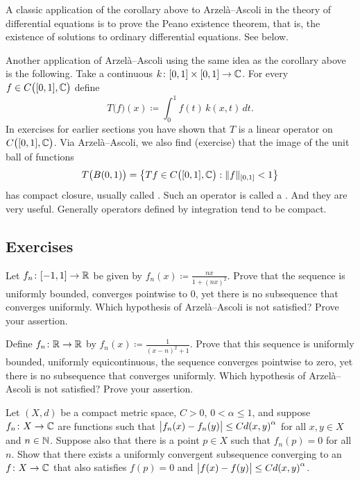 A classic application of the corollary above to Arzel\`a--Ascoli
in the theory of differential
equations is to prove the Peano existence
theorem, that is, the existence of solutions to ordinary differential
equations.  See  below.

\medskip

Another application of Arzel\`a--Ascoli using the same idea as the
corollary above is the following.
Take a continuous $k \colon [0,1] \times [0,1] \to {\mathbb{C}}$.
For every $f \in C\bigl([0,1],{\mathbb{C}}\bigr)$ define
\begin{equation*}
T\bigl(f\bigr)(x) \coloneqq  \int_0^1 f(t) \, k(x,t)\,dt .
\end{equation*}
In exercises for earlier sections you have shown that 
$T$ is a linear operator on $C\bigl([0,1],{\mathbb{C}}\bigr)$.
Via Arzel\`a--Ascoli, we also find (exercise) that
the image of the unit ball of functions
\begin{equation*}
T\bigl( B(0,1) \bigr) = 
\bigl\{
Tf \in C\bigl([0,1],{\mathbb{C}}\bigr) :  
\lVert {f} \rVert_{[0,1]} < 1
\bigr\}
\end{equation*}
has compact closure, usually called
\emph{}.
Such an operator is called a \emph{}.
And they are very useful.  Generally operators defined by
integration tend to be compact.

\subsection{Exercises}

\begin{exercise}
Let $f_n \colon [-1,1] \to {\mathbb{R}}$ be given by $f_n(x) \coloneqq \frac{nx}{1+{(nx)}^2}$.
Prove that the sequence is uniformly bounded, converges pointwise to 0,
yet there is no
subsequence that converges uniformly.
Which hypothesis of Arzel\`a--Ascoli
is not satisfied?  Prove your assertion.
\end{exercise}

\begin{exercise}
Define $f_n \colon {\mathbb{R}} \to {\mathbb{R}}$ by $f_n(x) \coloneqq \frac{1}{{(x-n)}^2+1}$.  Prove that
this sequence is uniformly bounded, uniformly equicontinuous, the sequence
converges pointwise to zero, yet there is no
subsequence that converges uniformly.
Which hypothesis of Arzel\`a--Ascoli
is not satisfied?  Prove your assertion.
\end{exercise}

\begin{exercise}
Let $(X,d)$ be a compact metric space, $C > 0$, $0 < \alpha \leq 1$, and
suppose $f_n \colon X \to {\mathbb{C}}$ are functions such that
$\bigl\lvert {f_n(x)-f_n(y)} \bigr\rvert \leq C {d(x,y)}^\alpha$ for all $x,y \in X$ and
$n \in {\mathbb{N}}$.  Suppose also that there is a point $p \in X$ such that
$f_n(p) = 0$ for all $n$.
Show that there exists a uniformly convergent subsequence converging to
an $f \colon X \to {\mathbb{C}}$ that also satisfies $f(p) = 0$ and
$\bigl\lvert {f(x)-f(y)} \bigr\rvert \leq C {d(x,y)}^\alpha$.
\end{exercise}

